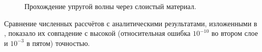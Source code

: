 \begin{figure}
\begin{minipage}[h]{0.47\linewidth}
 \\
\end{minipage}
\hfill
\begin{minipage}[h]{0.47\linewidth}
 \\
\end{minipage}
\caption{Прохождение упругой волны через слоистый материал.}
\label{pic:mnogosloika}
\end{figure}

Сравнение численных рассчётов с аналитическими результатами, изложенными в \cite{petrov_tormasov_holodov}, показало их совпадение с высокой (относительная ошибка $10^{-10}$ во втором слое и $10^{-3}$ в пятом) точностью.

